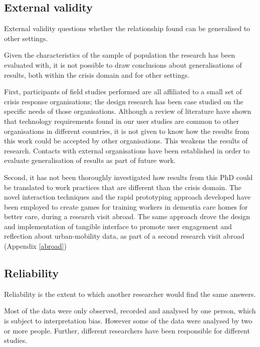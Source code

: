 \subsection{External validity}\label{external-validity}

External validity questions whether the relationship found can be generalised to other settings.

Given the characteristics of the sample of population the research has been evaluated with, it is not possible to draw conclusions about generalisations of results, both within the crisis domain and for other settings.

First, participants of field studies performed are all affiliated to a small set of crisis response organisations; the design research has been case studied on the specific needs of those organisations. Although a review of literature have shown that technology requirements found in our user studies are common to other organisations in different countries, it is not given to know how the results from this work could be accepted by other organisations. This weakens the results of research. Contacts with external organisations have been established in order to evaluate generalisation of results as part of future work.

Second, it has not been thoroughly investigated how results from this PhD could be translated to work practices that are different than the crisis domain. The novel interaction techniques and the rapid prototyping approach developed have been employed to create games for training workers in dementia care homes for better care, during a research visit abroad. The same approach drove the design and implementation of tangible interface to promote user engagement and reflection about urban-mobility data, as part of a second research visit abroad (Appendix \ref{abroad})

\subsection{Reliability}\label{reliability}

Reliability is the extent to which another researcher would find the same answers.

Most of the data were only observed, recorded and analysed by one person, which is subject to interpretation bias. However some of the data were analysed by two or more people. Further, different researchers have been responsible for different studies. 
